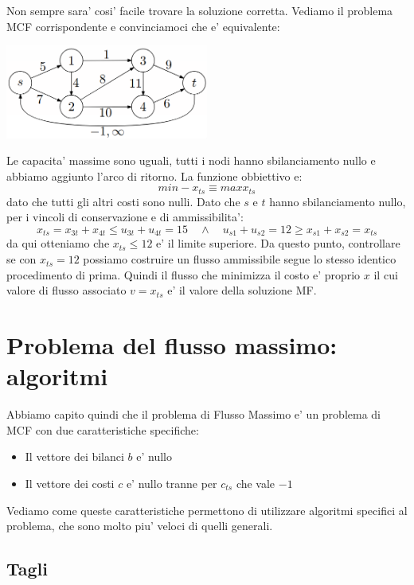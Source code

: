 {  Non sempre sara' cosi' facile trovare la soluzione corretta. Vediamo il problema MCF corrispondente e convinciamoci che e' equivalente:
  \begin{center}
    \includegraphics[width=0.5\textwidth]{img/2025-03-13-11-38-15.png}
  \end{center}

Le capacita' massime sono uguali, tutti i nodi hanno sbilanciamento nullo e abbiamo aggiunto l'arco di ritorno. La funzione obbiettivo e:
\[
min -x_{ts} \equiv max x_{ts}
\]
dato che tutti gli altri costi sono nulli. Dato che $ s  $ e $ t $ hanno sbilanciamento nullo, per i vincoli di conservazione e di ammissibilita':
\[
x_{ts} = x_{3t} + x_{4t} \leq u_{3t} + u_{4t} = 15 \quad \land \quad u_{s1} + u_{s2} = 12 \geq x_{s1} + x_{s2} = x_{ts}
\]
da qui otteniamo che $ x_{ts} \leq 12 $ e' il limite superiore. Da questo punto, controllare se con $ x_{ts} = 12 $ possiamo costruire un flusso ammissibile segue lo stesso identico procedimento di prima. Quindi il flusso che minimizza il costo e' proprio $ x $ il cui valore di flusso associato $ v = x_{ts} $ e' il valore della soluzione MF.
}
  
\section{Problema del flusso massimo: algoritmi}
Abbiamo capito quindi che il problema di Flusso Massimo e' un problema di MCF con due caratteristiche specifiche:
\begin{itemize}
\item Il vettore dei bilanci $ b $ e' nullo
\item Il vettore dei costi $ c $ e' nullo tranne per $ c_{ts} $ che vale $ -1 $
\end{itemize}
Vediamo come queste caratteristiche permettono di utilizzare algoritmi specifici al problema, che sono molto piu' veloci di quelli generali.

\subsection{Tagli}


